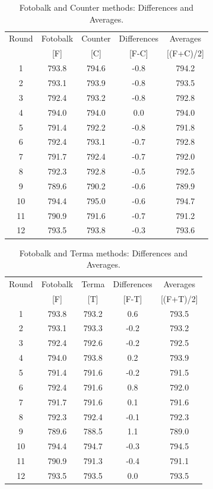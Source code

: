 \documentclass[12pt, a4paper]{report}
\theoremstyle{plain}
\theoremstyle{definition}
\theoremstyle{remark}
\begin{document}
	
	\begin{table}[h!]
		\renewcommand\arraystretch{0.7}%
		\begin{center}
			\begin{tabular}{|c||c|c||c|c|}
				\hline
				Round & Fotobalk  & Counter  & Differences  & Averages  \\
				&  [F] & [C] & [F-C] &  [(F+C)/2] \\
				\hline
				1 & 793.8 & 794.6 & -0.8 & 794.2 \\
				2 & 793.1 & 793.9 & -0.8 & 793.5 \\
				3 & 792.4 & 793.2 & -0.8 & 792.8 \\
				4 & 794.0 & 794.0 & 0.0 & 794.0 \\
				5 & 791.4 & 792.2 & -0.8 & 791.8 \\
				6 & 792.4 & 793.1 & -0.7 & 792.8 \\
				7 & 791.7 & 792.4 & -0.7 & 792.0 \\
				8 & 792.3 & 792.8 & -0.5 & 792.5 \\
				9 & 789.6 & 790.2 & -0.6 & 789.9 \\
				10 & 794.4 & 795.0 & -0.6 & 794.7 \\
				11 & 790.9 & 791.6 & -0.7 & 791.2 \\
				12 & 793.5 & 793.8 & -0.3 & 793.6 \\
				\hline
			\end{tabular}
			\caption{Fotobalk and Counter methods: Differences and Averages.}
		\end{center}
	\end{table}
	
	\begin{table}[h!]
		\renewcommand\arraystretch{0.7}%
		\begin{center}
			\begin{tabular}{|c||c|c||c|c|}
				\hline
				Round & Fotobalk  & Terma  & Differences  & Averages  \\
				&  [F] & [T] & [F-T] &  [(F+T)/2] \\
				\hline
				1 & 793.8 & 793.2 & 0.6 & 793.5 \\
				2 & 793.1 & 793.3 & -0.2 & 793.2 \\
				3 & 792.4 & 792.6 & -0.2 & 792.5 \\
				4 & 794.0 & 793.8 & 0.2 & 793.9 \\
				5 & 791.4 & 791.6 & -0.2 & 791.5 \\
				6 & 792.4& 791.6 & 0.8 & 792.0 \\
				7 & 791.7 & 791.6 & 0.1 & 791.6 \\
				8 & 792.3 & 792.4 & -0.1 & 792.3 \\
				9 & 789.6 & 788.5 & 1.1 & 789.0 \\
				10 & 794.4 & 794.7 & -0.3 & 794.5 \\
				11 & 790.9 & 791.3 & -0.4 & 791.1 \\
				12 & 793.5 & 793.5 & 0.0 & 793.5 \\
				
				\hline
			\end{tabular}
			\caption{Fotobalk and Terma methods: Differences and Averages.}
		\end{center}
	\end{table}
	
\end{document}
